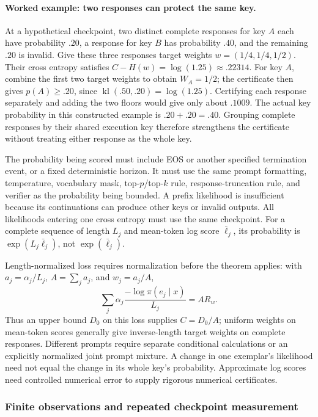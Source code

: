 \documentclass{article}
\newcommand{\1}{\mathbf 1}
\theoremstyle{remark}
\theoremstyle{definition}
\theoremstyle{plain}
\begin{document}
\paragraph{Worked example: two responses can protect the same key.}
At a hypothetical checkpoint, two distinct complete responses for key $A$
each have probability $.20$, a response for key $B$ has probability $.40$,
and the remaining $.20$ is invalid. Give these three responses target weights
$w=(1/4,1/4,1/2)$. Their cross entropy satisfies
$C-H(w)=\log(1.25)\approx.22314$.
For key $A$, combine the first two target weights to obtain $W_A=1/2$;
the certificate then gives $p(A)\ge.20$, since
$\operatorname{kl}(.50,.20)=\log(1.25)$.
Certifying each response separately and adding the two floors would give only
about $.1009$. The actual key probability in this constructed example is
$.20+.20=.40$. Grouping complete responses by their shared execution key
therefore strengthens the certificate without treating either response as
the whole key.

The probability being scored must include EOS or another specified
termination event, or a fixed deterministic horizon. It must use the same
prompt formatting, temperature, vocabulary mask, top-$p$/top-$k$ rule,
response-truncation rule, and verifier as the probability being bounded.
A prefix likelihood is insufficient because its continuations can produce
other keys or invalid outputs. All likelihoods entering one cross entropy
must use the same checkpoint. For a complete sequence of length $L_j$ and
mean-token log score $\bar\ell_j$, its probability is
$\exp(L_j\bar\ell_j)$, not $\exp(\bar\ell_j)$.

Length-normalized loss requires normalization before the theorem applies:
with $a_j=\alpha_j/L_j$, $A=\sum_j a_j$, and $w_j=a_j/A$,
\[
 \sum_j\alpha_j\frac{-\log\pi(e_j\mid x)}{L_j}=A R_w.
\]
Thus an upper bound $D_0$ on this loss supplies $C=D_0/A$; uniform weights
on mean-token scores generally give inverse-length target weights on
complete responses. Different prompts require separate conditional
calculations or an explicitly normalized joint prompt mixture. A change
in one exemplar's likelihood need not equal the change in its whole key's
probability. Approximate log scores need controlled numerical error to
supply rigorous numerical certificates.

\subsubsection{Finite observations and repeated checkpoint measurement}
\end{document}

